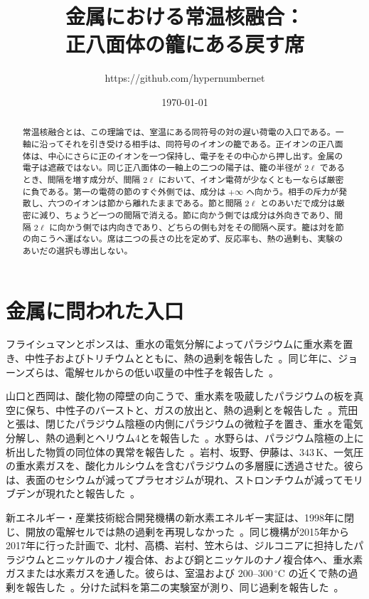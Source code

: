 \documentclass[a4paper]{article}
\title{金属における常温核融合：\\
正八面体の籠にある戻す席}
\author{https://github.com/hypernumbernet}
\date{\today}
\begin{document}
\maketitle

\begin{abstract}
常温核融合とは、この理論では、室温にある同符号の対の遅い荷電の入口である。一軸に沿ってそれを引き受ける相手は、同符号のイオンの籠である。正イオンの正八面体は、中心にさらに正のイオンを一つ保持し、電子をその中心から押し出す。金属の電子は遮蔽ではない。同じ正八面体の一軸上の二つの陽子は、籠の半径が \(2\ell\) であるとき、間隔を増す成分が、間隔 \(2\ell\) において、イオン電荷が少なくとも一ならば厳密に負である。第一の電荷の節のすぐ外側では、成分は \(+\infty\) へ向かう。相手の斥力が発散し、六つのイオンは節から離れたままである。節と間隔 \(2\ell\) とのあいだで成分は厳密に減り、ちょうど一つの間隔で消える。節に向かう側では成分は外向きであり、間隔 \(2\ell\) に向かう側では内向きであり、どちらの側も対をその間隔へ戻す。籠は対を節の向こうへ運ばない。席は二つの長さの比を定めず、反応率も、熱の過剰も、実験のあいだの選択も導出しない。
\end{abstract}

\section{金属に問われた入口}
\label{sec:reports}

フライシュマンとポンスは、重水の電気分解によってパラジウムに重水素を置き、中性子およびトリチウムとともに、熱の過剰を報告した~\cite{fleischmann1989}。同じ年に、ジョーンズらは、電解セルからの低い収量の中性子を報告した~\cite{jones1989}。

山口と西岡は、酸化物の障壁の向こうで、重水素を吸蔵したパラジウムの板を真空に保ち、中性子のバーストと、ガスの放出と、熱の過剰とを報告した~\cite{yamaguchi1990}。荒田と張は、閉じたパラジウム陰極の内側にパラジウムの微粒子を置き、重水を電気分解し、熱の過剰とヘリウム4とを報告した~\cite{arata1999}。水野らは、パラジウム陰極の上に析出した物質の同位体の異常を報告した~\cite{mizuno1996}。岩村、坂野、伊藤は、\(343\,\mathrm{K}\)、一気圧の重水素ガスを、酸化カルシウムを含むパラジウムの多層膜に透過させた。彼らは、表面のセシウムが減ってプラセオジムが現れ、ストロンチウムが減ってモリブデンが現れたと報告した~\cite{iwamura2002}。

新エネルギー・産業技術総合開発機構の新水素エネルギー実証は、1998年に閉じ、開放の電解セルでは熱の過剰を再現しなかった~\cite{nhe1998}。同じ機構が2015年から2017年に行った計画で、北村、高橋、岩村、笠木らは、ジルコニアに担持したパラジウムとニッケルのナノ複合体、および銅とニッケルのナノ複合体へ、重水素ガスまたは水素ガスを通した。彼らは、室温および \(200\)--\(300\,^{\circ}\mathrm{C}\) の近くで熱の過剰を報告した~\cite{kitamura2017}。分けた試料を第二の実験室が測り、同じ過剰を報告した~\cite{iwamura2017}。
\end{document}
